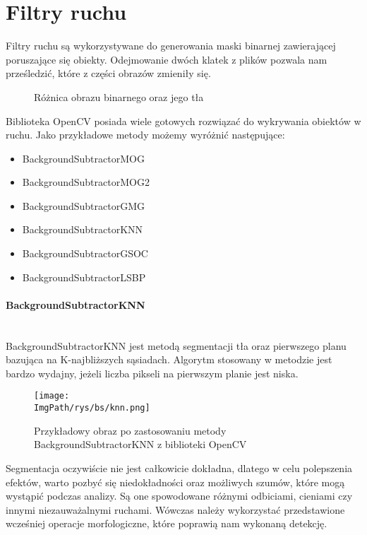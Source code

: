 \documentclass[a4paper,12pt,twoside,openany]{report}
\newcommand{\ImgPath}{.}
\begin{document}
\section{Filtry ruchu}
Filtry ruchu są wykorzystywane do generowania maski binarnej zawierającej poruszające się obiekty. Odejmowanie dwóch klatek z plików pozwala nam prześledzić, które z części obrazów zmieniły się. 

\begin{figure}[H]
	\centering
	\caption{Różnica obrazu binarnego oraz jego tła}
\end{figure}

Biblioteka OpenCV posiada wiele gotowych rozwiązać do wykrywania obiektów w ruchu\cite{opencvs2}. Jako przykładowe metody możemy wyróżnić następujące:
\begin{itemize} 
	\item BackgroundSubtractorMOG
	\item BackgroundSubtractorMOG2
	\item BackgroundSubtractorGMG
	\item BackgroundSubtractorKNN
	\item BackgroundSubtractorGSOC
	\item BackgroundSubtractorLSBP
\end{itemize} 
	
\paragraph{BackgroundSubtractorKNN} \mbox{} \\
 \indent
 BackgroundSubtractorKNN jest metodą segmentacji tła oraz pierwszego planu bazująca na K-najbliższych sąsiadach. Algorytm stosowany w metodzie jest bardzo wydajny, jeżeli liczba pikseli na pierwszym planie jest niska\cite{KNN}. 

\begin{figure}[H]	
	\centering
	\texttt{[image: \\ImgPath/rys/bs/knn.png]}
	
	\caption{Przykładowy obraz po zastosowaniu metody BackgroundSubtractorKNN z biblioteki OpenCV}
\end{figure}
 
 Segmentacja oczywiście nie jest całkowicie dokładna, dlatego w celu polepszenia efektów, warto pozbyć się niedokładności oraz możliwych szumów,  które mogą wystąpić podczas analizy. Są one spowodowane różnymi odbiciami, cieniami czy innymi niezauważalnymi ruchami. Wówczas należy wykorzystać przedstawione wcześniej operacje morfologiczne, które poprawią nam wykonaną detekcję.
\end{document}
